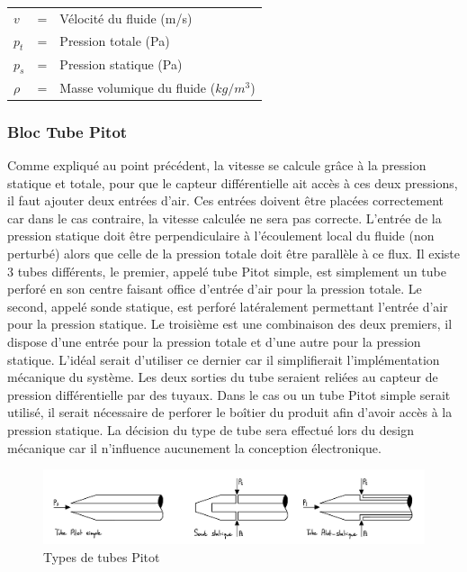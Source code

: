         \begin{tabular}{l l l}
            $v$ & = & Vélocité du fluide (m/s) \\
            $p_{t}$ & = & Pression totale (Pa) \\
            $p_{s}$ & = & Pression statique (Pa) \\
            $\rho$ & = & Masse volumique du fluide ($kg/m^3$) \\
        \end{tabular}
        \vspace{1cm}
    
    
    \subsubsection{Bloc Tube Pitot}
        Comme expliqué au point précédent, la vitesse se calcule grâce à la pression statique et totale, pour que le capteur différentielle ait accès à ces deux pressions, il faut ajouter deux entrées d'air. Ces entrées doivent être placées correctement car dans le cas contraire, la vitesse calculée ne sera pas correcte. L'entrée de la pression statique doit être perpendiculaire à l'écoulement local du fluide (non perturbé) alors que celle de la pression totale doit être parallèle à ce flux. Il existe 3 tubes différents, le premier, appelé tube Pitot simple, est simplement un tube perforé en son centre faisant office d'entrée d'air pour la pression totale. Le second, appelé sonde statique, est perforé latéralement permettant l'entrée d'air pour la pression statique. Le troisième est une combinaison des deux premiers, il dispose d'une entrée pour la pression totale et d'une autre pour la pression statique. L'idéal serait d'utiliser ce dernier car il simplifierait l'implémentation mécanique du système. Les deux sorties du tube seraient reliées au capteur de pression différentielle par des tuyaux. Dans le cas ou un tube Pitot simple serait utilisé, il serait nécessaire de perforer le boîtier du produit afin d'avoir accès à la pression statique.
        La décision du type de tube sera effectué lors du design mécanique car il n'influence aucunement la conception électronique.
        \begin{figure}[h]
            \caption{Types de tubes Pitot}
            \centering
            \includegraphics[width=15cm]{Images/TubesPitot.jpg}
        \end{figure}

